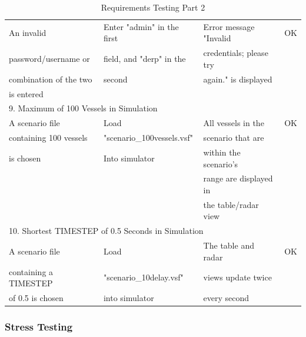 \documentclass[12pt]{article}
\begin{document}
\begin{table}[ht]
\begin{tabular}{|l|l|l|l|}
        \hline
       An invalid & Enter "admin" in the first & Error message "Invalid & OK\\
       password/username or & field, and "derp" in the & credentials; please try &\\
       combination of the two & second & again." is displayed &\\
       is entered & & & \\
        \hline
        \multicolumn{4}{|l|}{9. Maximum of 100 Vessels in Simulation} \\
        \hline
       A scenario file & Load & All vessels in the & OK\\
       containing 100 vessels & "scenario\_100vessels.vsf" & scenario that are & \\
       is chosen & Into simulator & within the scenario’s &\\
       & & range are displayed in &\\
       & & the table/radar view  &\\
       \hline
        \multicolumn{4}{|l|}{10. Shortest TIMESTEP of 0.5 Seconds in Simulation} \\
        \hline
       A scenario file & Load & The table and radar & OK\\
       containing a TIMESTEP & "scenario\_10delay.vsf" & views update twice &\\
       of 0.5 is chosen & into simulator & every second &\\
       \hline
    \end{tabular}
\caption{Requirements Testing Part 2}
\label{tab:Requirements Testing Part 2}
\end{table}

\clearpage


















\subsubsection{Stress Testing}
\end{document}

